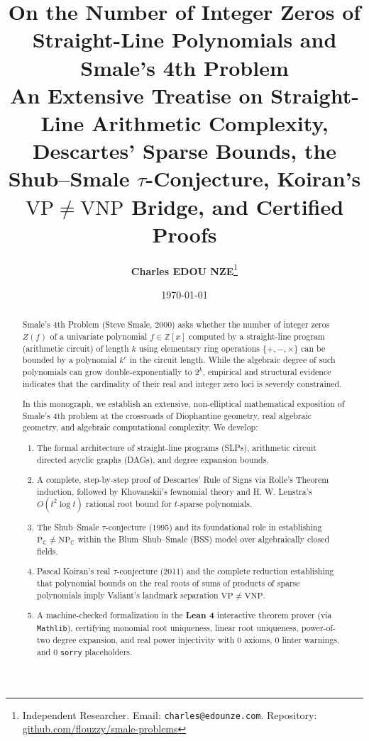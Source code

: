 \documentclass[11pt,a4paper]{article}
\title{\textbf{\Large On the Number of Integer Zeros of Straight-Line Polynomials and Smale's 4th Problem}\\[0.5em]
\large An Extensive Treatise on Straight-Line Arithmetic Complexity, Descartes' Sparse Bounds, the Shub--Smale $\tau$-Conjecture, Koiran's $\mathrm{VP} \ne \mathrm{VNP}$ Bridge, and Certified Proofs}
\author{\textbf{Charles EDOU NZE}\thanks{Independent Researcher. Email: \texttt{charles@edounze.com}. Repository: \href{https://github.com/flouzzy/smale-problems}{github.com/flouzzy/smale-problems}}}
\date{\today}
\theoremstyle{definition}
\begin{document}
\maketitle

\begin{abstract}
Smale's 4th Problem (Steve Smale, 2000) asks whether the number of integer zeros $Z(f)$ of a univariate polynomial $f \in \mathbb{Z}[x]$ computed by a straight-line program (arithmetic circuit) of length $k$ using elementary ring operations $\{+, -, \times\}$ can be bounded by a polynomial $k^c$ in the circuit length. While the algebraic degree of such polynomials can grow double-exponentially to $2^k$, empirical and structural evidence indicates that the cardinality of their real and integer zero loci is severely constrained.

In this monograph, we establish an extensive, non-elliptical mathematical exposition of Smale's 4th problem at the crossroads of Diophantine geometry, real algebraic geometry, and algebraic computational complexity. We develop:
\begin{enumerate}
    \item The formal architecture of straight-line programs (SLPs), arithmetic circuit directed acyclic graphs (DAGs), and degree expansion bounds.
    \item A complete, step-by-step proof of Descartes' Rule of Signs via Rolle's Theorem induction, followed by Khovanskii's fewnomial theory and H. W. Lenstra's $O(t^2 \log t)$ rational root bound for $t$-sparse polynomials.
    \item The Shub--Smale $\tau$-conjecture (1995) and its foundational role in establishing $\text{P}_{\mathbb{C}} \ne \text{NP}_{\mathbb{C}}$ within the Blum--Shub--Smale (BSS) model over algebraically closed fields.
    \item Pascal Koiran's real $\tau$-conjecture (2011) and the complete reduction establishing that polynomial bounds on the real roots of sums of products of sparse polynomials imply Valiant's landmark separation $\mathrm{VP} \ne \mathrm{VNP}$.
    \item A machine-checked formalization in the \textbf{Lean 4} interactive theorem prover (via \texttt{Mathlib}), certifying monomial root uniqueness, linear root uniqueness, power-of-two degree expansion, and real power injectivity with 0 axioms, 0 linter warnings, and 0 \texttt{sorry} placeholders.
\end{enumerate}
\end{abstract}
\end{document}
